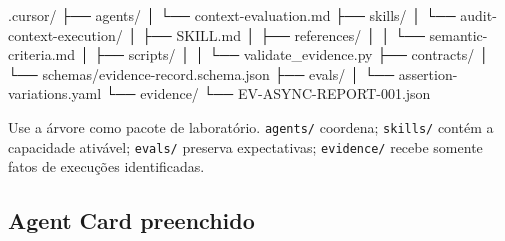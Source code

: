 \documentclass[
  10pt,
  a4paper,
  oneside]{book}
\newenvironment{Shaded}{}{}
\newcommand{\NormalTok}[1]{#1}
\begin{document}
\begin{Shaded}
\begin{Highlighting}[]
\NormalTok{.cursor/}
\NormalTok{├── agents/}
\NormalTok{│   └── context{-}evaluation.md}
\NormalTok{├── skills/}
\NormalTok{│   └── audit{-}context{-}execution/}
\NormalTok{│       ├── SKILL.md}
\NormalTok{│       ├── references/}
\NormalTok{│       │   └── semantic{-}criteria.md}
\NormalTok{│       ├── scripts/}
\NormalTok{│       │   └── validate\_evidence.py}
\NormalTok{├── contracts/}
\NormalTok{│   └── schemas/evidence{-}record.schema.json}
\NormalTok{├── evals/}
\NormalTok{│   └── assertion{-}variations.yaml}
\NormalTok{└── evidence/}
\NormalTok{    └── EV{-}ASYNC{-}REPORT{-}001.json}
\end{Highlighting}
\end{Shaded}

Use a árvore como pacote de laboratório. \texttt{agents/} coordena;
\texttt{skills/} contém a capacidade ativável; \texttt{evals/} preserva
expectativas; \texttt{evidence/} recebe somente fatos de execuções
identificadas.

\hypertarget{agent-card-preenchido}{%
\subsection{Agent Card preenchido}\label{agent-card-preenchido}}
\end{document}
